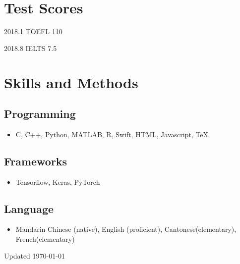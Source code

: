 \documentclass{academiccv}
\begin{document}
\section*{Test Scores}

\begin{tablist}
	\item[2018.1] \tab TOEFL 110
	\item[2018.8] \tab IELTS 7.5
	\end{tablist}


\section*{Skills and Methods}

\subsection*{Programming}
\begin{itemize}
	\item C, C++, Python, MATLAB, R, Swift, HTML, Javascript, \TeX{}
\end{itemize}

\subsection*{Frameworks}
\begin{itemize}
	\item Tensorflow, Keras, PyTorch
\end{itemize}

\subsection*{Language}

\begin{itemize}
	\item  Mandarin Chinese (native), English (proficient), Cantonese(elementary), French(elementary)
\end{itemize}



\begin{center}
\vspace{6em}
Updated \monthyeardate\today
\end{center}
\end{document}
